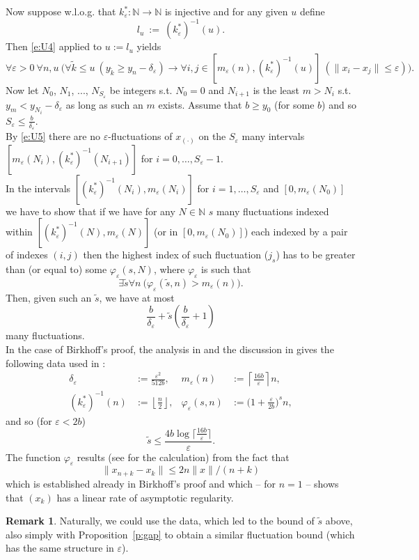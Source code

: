 \documentclass[1p]{elsarticle}
\newcommand{\NN}{\ensuremath{\mathbb{N}}}
\theoremstyle{plain}
\theoremstyle{definition}
\newtheorem{rmk}[thm]{Remark}
\theoremstyle{remark}
\renewcommand{\phi}{\varphi}
\renewcommand{\epsilon}{\varepsilon}
\theoremstyle{definition}
\begin{document}
{Now suppose w.l.o.g. that $k^*_\epsilon:\NN\to\NN$ is injective and for any given $u$ define
\[
l_u\ :=\ (k^*_\epsilon)^{-1}(u).
\]
Then \eqref{e:U4} applied to $u:=l_u$ yields
\[
\forall \epsilon>0\ \forall n,u\ \Big( \forall \tilde k\le u\ 
(y_{\tilde k}\geq y_n-\delta_\epsilon)\rightarrow 
 \forall i,j\in[m_\epsilon(n),(k^*_\epsilon)^{-1}(u)]\ 
(\|x_i-x_j\|\leq \epsilon) \Big).
\tag{-}\label{e:U5}\]
Now let $N_0$, $N_1$, ..., $N_{S_\epsilon}$ be integers s.t. $N_0=0$ and $N_{i+1}$ is the least $m>N_i$ s.t. $y_m<y_{N_i}-\delta_\epsilon$ as long as such an $m$ exists.
Assume that $b\geq y_0$ (for some $b$) and so $S_\epsilon\leq\frac{b}{\delta_\epsilon}$.\\
By \eqref{e:U5} there are no $\epsilon$-fluctuations of $x_{(\cdot)}$ on the 
$S_\epsilon$ many intervals $[m_\epsilon(N_i),(k^*_\epsilon)^{-1}
(N_{i+1})]$ for $i=0,\ldots,S_{\varepsilon}-1$.\\
In the intervals $[(k^*_\epsilon)^{-1}(N_{i}),m_\epsilon(N_i)]$ 
for $i=1,\ldots,
S_\epsilon$ and $[0,m_\epsilon(N_0)]$ we have to show that if we have for 
any $N\in\NN$ $s$ many
fluctuations indexed within $[(k^*_\epsilon)^{-1}(N),m_\epsilon(N)]$ 
(or in $[0,m_\epsilon(N_0)]$) each indexed by a pair of indexes $(i,j)$ 
then the highest index of such fluctuation ($j_s$) has to be greater than 
(or equal to) some $\phi_\epsilon(s,N)$, where $\phi_\epsilon$ is such that
\[
\exists \tilde s\forall n\ \big(\phi_\epsilon(\tilde s,n)>m_\epsilon(n)\big).
\]
Then, given such an $\tilde s$, we have at most
\[
\frac{b}{\delta_\epsilon}+\tilde s\left(\frac{b}{\delta_\epsilon}+1\right)
\]
many fluctuations.
\\[2mm]
In the case of Birkhoff's proof, the analysis in \cite{Kohlenbach/Leustean4} 
and the discussion in \cite{Avigad/Rute} 
gives the following data used in \cite{Avigad/Rute}: 
\begin{align*}
\delta_\epsilon &:= \frac{\epsilon^2}{512b},& m_\epsilon(n)&:=\left\lceil 
\frac{16b}{\epsilon}\right\rceil n,\\
(k^*_\epsilon)^{-1}(n)&:=\left\lfloor\frac{n}{2}\right\rfloor,& 
\phi_\epsilon(s,n)&:=\big(1+ \frac{\epsilon}{2b}\big)^s n,
\end{align*}
and so (for $\varepsilon <2b$) \[ \tilde s \leq \frac{ 4 b\log \big\lceil 
\frac{16b}{\epsilon}\big\rceil }{\epsilon}.\]
The function $\varphi_{\varepsilon}$ results (see \cite{Avigad/Rute} for 
the calculation) from the fact that 
\[ \| x_ {n+k}-x_k\|\le 2n\| x\|/(n+k) \]
which is established already in Birkhoff's proof and which -- for $n=1$ -- 
shows that $(x_k)$ has a linear rate of asymptotic regularity.
\begin{rmk}
Naturally, we could use the data, which led to the bound 
of $\tilde s$ above, also simply with Proposition~\ref{p:gap} to
obtain a similar fluctuation bound (which has the same structure in $\epsilon$).
\end{rmk}

}
\end{document}
